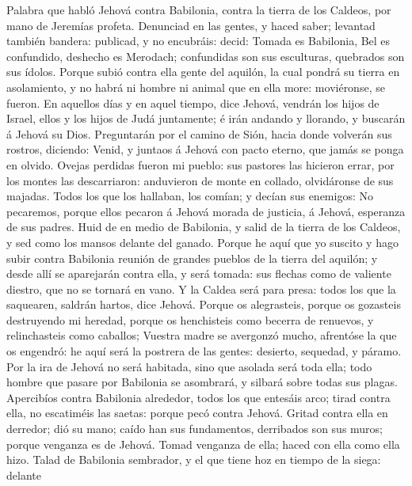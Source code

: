  Palabra que habló Jehová contra Babilonia, contra la
tierra de los Caldeos, por mano de Jeremías profeta. 
Denunciad en las gentes, y haced saber; levantad también bandera:
publicad, y no encubráis: decid: Tomada es Babilonia, Bel es confundido,
deshecho es Merodach; confundidas son sus esculturas, quebrados son sus
ídolos.  Porque subió contra ella gente del aquilón, la
cual pondrá su tierra en asolamiento, y no habrá ni hombre ni animal que
en ella more: moviéronse, se fueron.  En aquellos días y
en aquel tiempo, dice Jehová, vendrán los hijos de Israel, ellos y los
hijos de Judá juntamente; é irán andando y llorando, y buscarán á Jehová
su Dios.  Preguntarán por el camino de Sión, hacia donde
volverán sus rostros, diciendo: Venid, y juntaos á Jehová con pacto
eterno, que jamás se ponga en olvido.  Ovejas perdidas
fueron mi pueblo: sus pastores las hicieron errar, por los montes las
descarriaron: anduvieron de monte en collado, olvidáronse de sus
majadas.  Todos los que los hallaban, los comían; y decían
sus enemigos: No pecaremos, porque ellos pecaron á Jehová morada de
justicia, á Jehová, esperanza de sus padres.  Huid de en
medio de Babilonia, y salid de la tierra de los Caldeos, y sed como los
mansos delante del ganado.  Porque he aquí que yo suscito
y hago subir contra Babilonia reunión de grandes pueblos de la tierra
del aquilón; y desde allí se aparejarán contra ella, y será tomada: sus
flechas como de valiente diestro, que no se tornará en vano.
 Y la Caldea será para presa: todos los que la saquearen,
saldrán hartos, dice Jehová.  Porque os alegrasteis,
porque os gozasteis destruyendo mi heredad, porque os henchisteis como
becerra de renuevos, y relinchasteis como caballos; 
Vuestra madre se avergonzó mucho, afrentóse la que os engendró: he aquí
será la postrera de las gentes: desierto, sequedad, y páramo.
 Por la ira de Jehová no será habitada, sino que asolada
será toda ella; todo hombre que pasare por Babilonia se asombrará, y
silbará sobre todas sus plagas.  Apercibíos contra
Babilonia alrededor, todos los que entesáis arco; tirad contra ella, no
escatiméis las saetas: porque pecó contra Jehová.  Gritad
contra ella en derredor; dió su mano; caído han sus fundamentos,
derribados son sus muros; porque venganza es de Jehová. Tomad venganza
de ella; haced con ella como ella hizo.  Talad de
Babilonia sembrador, y el que tiene hoz en tiempo de la siega: delante
